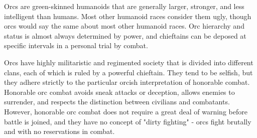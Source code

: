       Orcs are green-skinned humanoids that are generally larger, stronger, and less intelligent than humans.
      Most other humanoid races consider them ugly, though orcs would say the same about most other humanoid races.
      Orc hierarchy and status is almost always determined by power, and chieftains can be deposed at specific intervals in a personal trial by combat.

      Orcs have highly militaristic and regimented society that is divided into different clans, each of which is ruled by a powerful chieftain.
      They tend to be selfish, but they adhere strictly to the particular orcish interpretation of honorable combat.
      Honorable orc combat avoids sneak attacks or deception, allows enemies to surrender, and respects the distinction between civilians and combatants.
      However, honorable orc combat does not require a great deal of warning before battle is joined, and they have no concept of "dirty fighting" - orcs fight brutally and with no reservations in combat.
    

      

